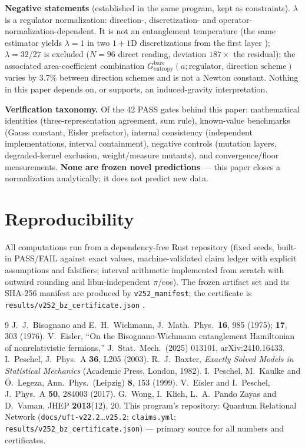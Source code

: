 \documentclass[aps,prb,preprint,nofootinbib]{revtex4-2}
\begin{document}
\textbf{Negative statements} (established in the same program, kept as
constraints). $\lambda$ is a regulator normalization: direction-,
discretization- and operator-normalization-dependent. It is not an
entanglement temperature (the same estimator yields $\lambda = 1$ in two
$1+1$D discretizations from the first layer \cite{Repo}); $\lambda = 32/27$ is
excluded ($N = 96$ direct reading, deviation $187\times$ the residual); the
associated area-coefficient combination
$G^{\mathrm{bare}}_{\mathrm{entropy}}(a;\text{regulator, direction scheme})$
varies by 3.7\% between direction schemes and is not a Newton constant.
Nothing in this paper depends on, or supports, an induced-gravity
interpretation.

\textbf{Verification taxonomy.} Of the 42 PASS gates behind this paper:
mathematical identities (three-representation agreement, sum rule), known-value
benchmarks (Gauss constant, Eisler prefactor), internal consistency
(independent implementations, interval containment), negative controls
(mutation layers, degraded-kernel exclusion, weight/measure mutants), and
convergence/floor measurements. \textbf{None are frozen novel predictions} ---
this paper closes a normalization analytically; it does not predict new data.

\section{Reproducibility}

All computations run from a dependency-free Rust repository (fixed seeds,
built-in PASS/FAIL against exact values, machine-validated claim ledger with
explicit assumptions and falsifiers; interval arithmetic implemented from
scratch with outward rounding and libm-independent $\pi$/cos). The frozen
artifact set and its SHA-256 manifest are produced by \texttt{v252\_manifest};
the certificate is \texttt{results/v252\_bz\_certificate.json} \cite{Repo}.

\begin{thebibliography}{9}
 J.~J.~Bisognano and E.~H.~Wichmann, J.\ Math.\ Phys.\ \textbf{16},
985 (1975); \textbf{17}, 303 (1976).
 V.~Eisler, ``On the Bisognano-Wichmann entanglement
Hamiltonian of nonrelativistic fermions,'' J.\ Stat.\ Mech.\ (2025) 013101,
arXiv:2410.16433.
 I.~Peschel, J.\ Phys.\ A \textbf{36}, L205 (2003).
 R.~J.~Baxter, \emph{Exactly Solved Models in Statistical
Mechanics} (Academic Press, London, 1982).
 I.~Peschel, M.~Kaulke and \"O.~Legeza, Ann.\
Phys.\ (Leipzig) \textbf{8}, 153 (1999).
 V.~Eisler and I.~Peschel, J.\ Phys.\ A \textbf{50},
284003 (2017).
 G.~Wong, I.~Klich, L.~A.~Pando Zayas and D.~Vaman, JHEP
\textbf{2013}(12), 20.
 This program's repository: Quantum Relational Network
(\texttt{docs/uft-v22.2}\ldots\texttt{v25.2}; \texttt{claims.yml};
\texttt{results/v252\_bz\_certificate.json}) --- primary source for all numbers
and certificates.
\end{thebibliography}
\end{document}
